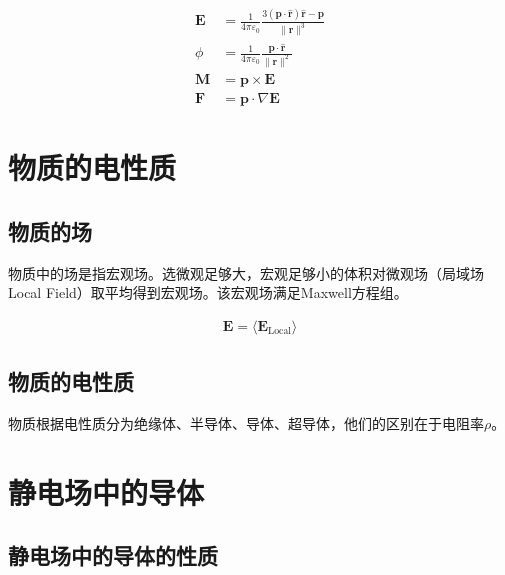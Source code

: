 \documentclass[12pt,onecolumn,a4paper]{book}
\newenvironment{block}[1]{
    \begin{tcolorbox}[colback=blue!5!white,colframe=blue!75!black,title=#1]
}{
    \end{tcolorbox}
}
\numberwithin{table}{subsection}
\numberwithin{equation}{subsection}
\begin{document}
\begin{block}{电偶极子}
    \begin{align}
        \mathbf{E} & = \frac{1}{4 \pi \varepsilon_0} \frac{3(\mathbf{p} \cdot \hat{\mathbf{r}}) \hat{\mathbf{r}} - \mathbf{p}}{\|\mathbf{r}\|^3} \\
        \phi       & = \frac{1}{4 \pi \varepsilon_0} \frac{\mathbf{p} \cdot \hat{\mathbf{r}}}{\|\mathbf{r}\|^2}                                  \\
        \mathbf{M} & = \mathbf{p} \times \mathbf{E}                                                                                              \\
        \mathbf{F} & = \mathbf{p} \cdot \nabla \mathbf{E}
    \end{align}
\end{block}

\newpage

\section{物质的电性质}

\subsection{物质的场}

物质中的场是指宏观场。选微观足够大，宏观足够小的体积对微观场（局域场 Local Field）取平均得到宏观场。该宏观场满足Maxwell方程组。

\begin{align}
    \mathbf{E} = \langle \mathbf{E}_\text{Local}\rangle
\end{align}

\subsection{物质的电性质}

物质根据电性质分为绝缘体、半导体、导体、超导体，他们的区别在于电阻率$\rho$。

\section{静电场中的导体}

\subsection{静电场中的导体的性质}
\end{document}
